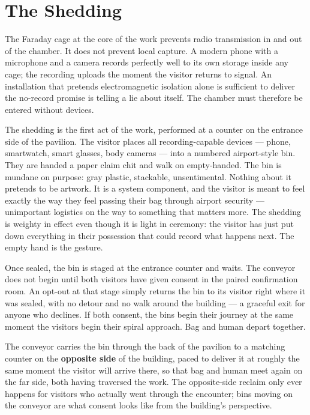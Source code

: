 \documentclass[10pt, letterpaper]{article}
\begin{document}
\section{The Shedding}

The Faraday cage at the core of the work prevents radio transmission in and out of the chamber. It does not prevent local capture. A modern phone with a microphone and a camera records perfectly well to its own storage inside any cage; the recording uploads the moment the visitor returns to signal. An installation that pretends electromagnetic isolation alone is sufficient to deliver the no-record promise is telling a lie about itself. The chamber must therefore be entered without devices.

The shedding is the first act of the work, performed at a counter on the entrance side of the pavilion. The visitor places all recording-capable devices --- phone, smartwatch, smart glasses, body cameras --- into a numbered airport-style bin. They are handed a paper claim chit and walk on empty-handed. The bin is mundane on purpose: gray plastic, stackable, unsentimental. Nothing about it pretends to be artwork. It is a system component, and the visitor is meant to feel exactly the way they feel passing their bag through airport security --- unimportant logistics on the way to something that matters more. The shedding is weighty in effect even though it is light in ceremony: the visitor has just put down everything in their possession that could record what happens next. The empty hand is the gesture.

Once sealed, the bin is staged at the entrance counter and waits. The conveyor does not begin until both visitors have given consent in the paired confirmation room. An opt-out at that stage simply returns the bin to its visitor right where it was sealed, with no detour and no walk around the building --- a graceful exit for anyone who declines. If both consent, the bins begin their journey at the same moment the visitors begin their spiral approach. Bag and human depart together.

The conveyor carries the bin through the back of the pavilion to a matching counter on the \textbf{opposite side} of the building, paced to deliver it at roughly the same moment the visitor will arrive there, so that bag and human meet again on the far side, both having traversed the work. The opposite-side reclaim only ever happens for visitors who actually went through the encounter; bins moving on the conveyor are what consent looks like from the building's perspective.
\end{document}
